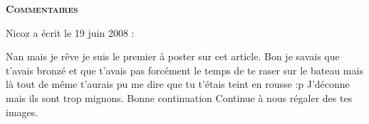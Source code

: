 \bigskip
\textbf{\textsc{Commentaires}}

\medskip
Nicoz a écrit le 19 juin 2008 :
\begin{displayquote}
Nan mais je rêve je suis le premier à poster sur cet article.
Bon je savais que t'avais bronzé et que t'avais pas forcément le temps de te raser sur le bateau mais là tout de même t'aurais pu me dire que tu t'étais teint en rousse :p
J'déconne mais ils sont trop mignons.
Bonne continuation
Continue à nous régaler des tes images.
\end{displayquote}

\vfill
